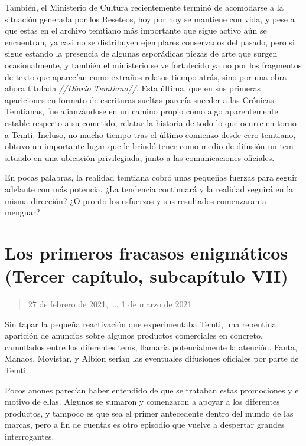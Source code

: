 \documentclass[
  spanish,
]{book}
\begin{document}
También, el Ministerio de Cultura recientemente terminó de acomodarse a la situación generada por los Reseteos, hoy por hoy se mantiene con vida, y pese a que estas en el archivo temtiano más importante que sigue activo aún se encuentran, ya casi no se distribuyen ejemplares conservados del pasado, pero si sigue estando la presencia de algunas esporádicas piezas de arte que surgen ocasionalmente, y también el ministerio se ve fortalecido ya no por los fragmentos de texto que aparecían como extraños relatos tiempo atrás, sino por una obra ahora titulada \emph{//Diario Temtiano//}. Esta última, que en sus primeras apariciones en formato de escrituras sueltas parecía suceder a las Crónicas Temtianas, fue afianzándose en un camino propio como algo aparentemente estable respecto a su cometido, relatar la historia de todo lo que ocurre en torno a Temti. Incluso, no mucho tiempo tras el último comienzo desde cero temtiano, obtuvo un importante lugar que le brindó tener como medio de difusión un tem situado en una ubicación privilegiada, junto a las comunicaciones oficiales.

En pocas palabras, la realidad temtiana cobró unas pequeñas fuerzas para seguir adelante con más potencia. ¿La tendencia continuará y la realidad seguirá en la misma dirección? ¿O pronto los esfuerzos y sus resultados comenzaran a menguar?

\hypertarget{los-primeros-fracasos-enigmuxe1ticos-tercer-capuxedtulo-subcapuxedtulo-vii}{%
\section{Los primeros fracasos enigmáticos (Tercer capítulo, subcapítulo VII)}\label{los-primeros-fracasos-enigmuxe1ticos-tercer-capuxedtulo-subcapuxedtulo-vii}}

\begin{quote}
27 de febrero de 2021, \ldots, 1 de marzo de 2021
\end{quote}

Sin tapar la pequeña reactivación que experimentaba Temti, una repentina aparición de anuncios sobre algunos productos comerciales en concreto, camuflados entre los diferentes tems, llamaría potencialmente la atención. Fanta, Manaos, Movistar, y Albion serían las eventuales difusiones oficiales por parte de Temti.

Pocos anones parecían haber entendido de que se trataban estas promociones y el motivo de ellas.
Algunos se sumaron y comenzaron a apoyar a los diferentes productos, y tampoco es que sea el primer antecedente dentro del mundo de las marcas, pero a fin de cuentas es otro episodio que vuelve a despertar grandes interrogantes.
\end{document}
